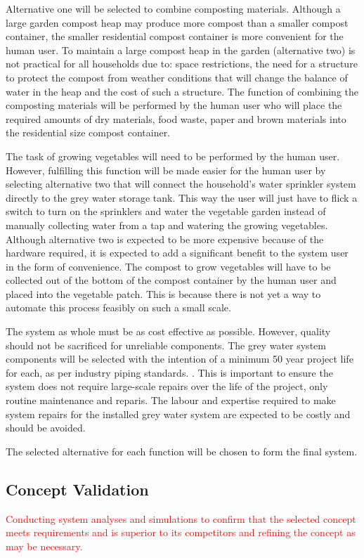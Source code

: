 \documentclass[a4paper,11pt,fleqn]{report}
\begin{document}
Alternative one will be selected to combine composting materials. Although a large garden compost heap may produce more compost than a smaller compost container, the smaller residential compost container is more convenient for the human user. To maintain a large compost heap in the garden (alternative two) is not practical for all households due to: space restrictions, the need for a structure to protect the compost from weather conditions that will change the balance of water in the heap and the cost of such a structure. The function of combining the composting materials will be performed by the human user who will place the required amounts of dry materials, food waste, paper and brown materials into the residential size compost container.

The task of growing vegetables will need to be performed by the human user. However, fulfilling this function will be made easier for the human user by selecting alternative two that will connect the household's water sprinkler system directly to the grey water storage tank. This way the user will just have to flick a switch to turn on the sprinklers and water the vegetable garden instead of manually collecting water from a tap and watering the growing vegetables. Although alternative two is expected to be more expensive because of the hardware required, it is expected to add a significant benefit to the system user in the form of convenience. The compost to grow vegetables will have to be collected out of the bottom of the compost container by the human user and placed into the vegetable patch. This is because there is not yet a way to automate this process feasibly on such a small scale.

The system as whole must be as cost effective as possible. However, quality should not be sacrificed for unreliable components. The grey water system components will be selected with the intention of a minimum 50 year project life for each, as per industry piping standards. \citep{Fischer2012}. This is important to ensure the system does not require large-scale repairs over the life of the project, only routine maintenance and reparis. The labour and expertise required to make system repairs for the installed grey water system are expected to be costly and should be avoided.

The selected alternative for each function will be chosen to form the final system.

\subsection{Concept Validation}
\textcolor{red}{Conducting system analyses and simulations to confirm that the selected concept meets requirements and is superior to its competitors and refining the concept as may be necessary.}
\end{document}
